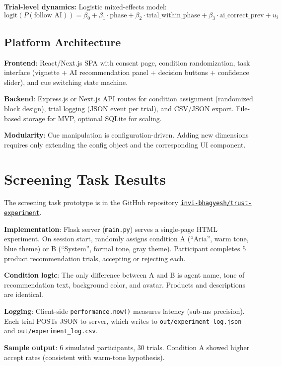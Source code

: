 \documentclass[12pt]{article}
\begin{document}
\textbf{Trial-level dynamics:} Logistic mixed-effects model:
\[
\text{logit}(P(\text{follow AI})) = \beta_0 + \beta_1 \cdot \text{phase} + \beta_2 \cdot \text{trial\_within\_phase} + \beta_3 \cdot \text{ai\_correct\_prev} + u_i
\]

\subsection{Platform Architecture}

\textbf{Frontend}: React/Next.js SPA with consent page, condition randomization, task interface (vignette + AI recommendation panel + decision buttons + confidence slider), and cue switching state machine.

\textbf{Backend}: Express.js or Next.js API routes for condition assignment (randomized block design), trial logging (JSON event per trial), and CSV/JSON export. File-based storage for MVP, optional SQLite for scaling.

\textbf{Modularity}: Cue manipulation is configuration-driven. Adding new dimensions requires only extending the config object and the corresponding UI component.

\section{Screening Task Results}

The screening task prototype is in the GitHub repository \href{https://github.com/invi-bhagyesh/trust-experiment}{\texttt{invi-bhagyesh/trust-experiment}}.

\textbf{Implementation}: Flask server (\texttt{main.py}) serves a single-page HTML experiment. On session start, randomly assigns condition A (``Aria'', warm tone, blue theme) or B (``System'', formal tone, gray theme). Participant completes 5 product recommendation trials, accepting or rejecting each.

\textbf{Condition logic}: The only difference between A and B is agent name, tone of recommendation text, background color, and avatar. Products and descriptions are identical.

\textbf{Logging}: Client-side \texttt{performance.now()} measures latency (sub-ms precision). Each trial POSTs JSON to server, which writes to \texttt{out/experiment\_log.json} and \texttt{out/experiment\_log.csv}.

\textbf{Sample output}: 6 simulated participants, 30 trials. Condition A showed higher accept rates (consistent with warm-tone hypothesis).
\end{document}
